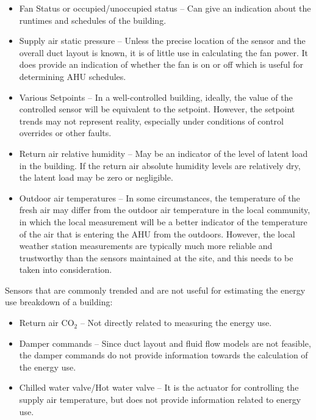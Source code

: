 \begin{itemize}
\item Fan Status or occupied/unoccupied status -- Can give an indication about the runtimes and schedules of the building.
\item Supply air static pressure -- Unless the precise location of the
    sensor and the overall duct layout is known, it is of little use in
    calculating the fan power. It does provide an indication of whether the
    fan is on or off which is useful for determining AHU schedules.
\item Various Setpoints -- In a well-controlled building, ideally, the
    value of the controlled sensor will be equivalent to the setpoint.
    However, the setpoint trends may not represent reality, especially
    under conditions of control overrides or other faults.
\item Return air relative humidity -- May be an indicator of the level of latent load in the building. If the return air absolute humidity levels are relatively dry, the latent load may be zero or negligible. 
\item Outdoor air temperatures -- In some circumstances, the temperature
    of the fresh air may differ from the outdoor air temperature in the
    local community, in which the local measurement will be a better
    indicator of the temperature of the air that is entering the AHU
    from the outdoors. However, the local weather station measurements
    are typically much more reliable and trustworthy than the sensors
    maintained at the site, and this needs to be taken into
    consideration.
\end{itemize}

Sensors that are commonly trended and are not useful for estimating the energy use breakdown of a building:
\begin{itemize}
\item Return air CO\(_2\) -- Not directly related to measuring the energy use.
\item Damper commands -- Since duct layout and fluid flow models are not feasible, the damper commands do not provide information towards the calculation of the energy use. 
\item Chilled water valve/Hot water valve -- It is the actuator for controlling the supply air temperature, but does not provide information related to energy use.
\end{itemize}





